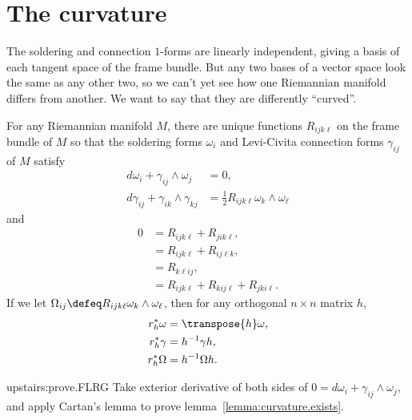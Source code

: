 \section{The curvature}
The soldering and connection \(1\)-forms are linearly independent, giving a basis of each tangent space of the frame bundle.
But any two bases of a vector space look the same as any other two, so we can't yet see how one Riemannian manifold differs from another.
We want to say that they are differently ``curved''.
\begin{lemma}\label{lemma:curvature.exists}
For any Riemannian manifold \(M\), there are unique functions \(R_{ijk\ell}\) on the frame bundle of \(M\) so that the soldering forms \(\omega_i\) and Levi-Civita connection forms \(\gamma_{ij}\) of \(M\) satisfy
\begin{align*}
d\omega_i + \gamma_{ij} \wedge \omega_j &= 0, \\
d\gamma_{ij} + \gamma_{ik} \wedge \gamma_{kj} &= \frac{1}{2}R_{ijk\ell} \omega_k \wedge \omega_{\ell}
\end{align*}
and
\begin{align*}
0 &= R_{ijk\ell} + R_{jik\ell},
\\
&= R_{ijk\ell} + R_{ij\ell k},
\\
&= R_{k\ell ij},
\\
&= R_{ijk\ell} + R_{kij\ell} + R_{jki\ell}.
\end{align*}
If we let \(\Omega_{ij} \defeq R_{ijk\ell} \omega_k \wedge \omega_{\ell}\), then
for any orthogonal \(n \times n\) matrix \(h\), 
\begin{align*}
r_h^* \omega &= \transpose{h} \omega, \\
r_h^* \gamma &= h^{-1} \gamma h, \\
r_h^* \Omega &= h^{-1} \Omega h.
\end{align*}
\end{lemma}
\begin{problem}{upstairs:prove.FLRG}
Take exterior derivative of both sides of \(0=d\omega_i + \gamma_{ij} \wedge \omega_j\), and apply Cartan's lemma to prove lemma~\vref{lemma:curvature.exists}.
\end{problem}
